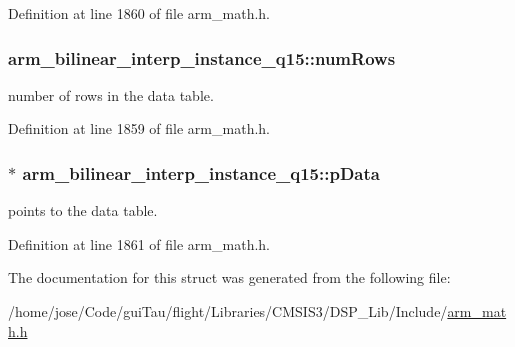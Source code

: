 Definition at line 1860 of file arm\-\_\-math.\-h.

\hypertarget{structarm__bilinear__interp__instance__q15_a2130ae30a804995a9f5d0e2189e08565}{
\subsubsection[{num\-Rows}]{ arm\-\_\-bilinear\-\_\-interp\-\_\-instance\-\_\-q15\-::num\-Rows}}\label{structarm__bilinear__interp__instance__q15_a2130ae30a804995a9f5d0e2189e08565}
number of rows in the data table. 

Definition at line 1859 of file arm\-\_\-math.\-h.

\hypertarget{structarm__bilinear__interp__instance__q15_a50d75b1316cee3e0dfad6dcc4c9a2954}{
\subsubsection[{p\-Data}]{$\ast$ arm\-\_\-bilinear\-\_\-interp\-\_\-instance\-\_\-q15\-::p\-Data}}\label{structarm__bilinear__interp__instance__q15_a50d75b1316cee3e0dfad6dcc4c9a2954}
points to the data table. 

Definition at line 1861 of file arm\-\_\-math.\-h.



The documentation for this struct was generated from the following file\-:\begin{DoxyCompactItemize}
\item 
/home/jose/\-Code/gui\-Tau/flight/\-Libraries/\-C\-M\-S\-I\-S3/\-D\-S\-P\-\_\-\-Lib/\-Include/\hyperlink{arm__math_8h}{arm\-\_\-math.\-h}\end{DoxyCompactItemize}
